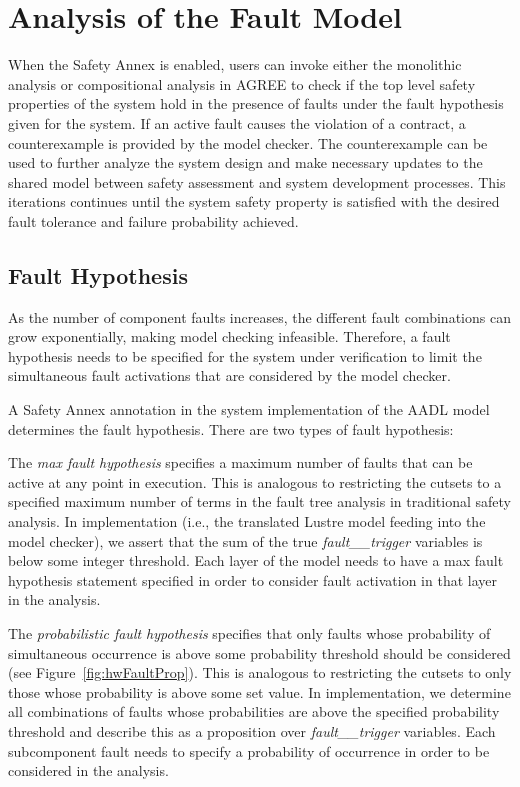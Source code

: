 \section{Analysis of the Fault Model}
\label{sec:fault_analysis}

When the Safety Annex is enabled, users can invoke either the monolithic analysis or compositional analysis in AGREE to check if the top level safety properties of the system hold in the presence of faults under the fault hypothesis given for the system. If an active fault causes the violation of a contract, a counterexample is provided by the model checker. The counterexample can be used to further analyze the system design and make necessary updates to the shared model between safety assessment and system development processes. This iterations continues until the system safety property is satisfied with the desired fault tolerance and failure probability achieved.

\subsection{Fault Hypothesis}
As the number of component faults increases, the different fault combinations can grow exponentially, making model checking infeasible. Therefore, a fault hypothesis needs to be specified for the system under verification to limit the simultaneous fault activations that are considered by the model checker.

A Safety Annex annotation in the system implementation of the AADL model determines the fault hypothesis. There are two types of fault hypothesis:

The \textit{max fault hypothesis} specifies a maximum number of faults that can be active at any point in execution. This is analogous to restricting the cutsets to a specified maximum number of terms in the fault tree analysis in
traditional safety analysis. In implementation (i.e., the translated Lustre model feeding into the model checker), we assert that the sum of the true {\em fault\_\_trigger} variables is below some integer threshold. Each layer of the model needs to have a max fault hypothesis statement specified in order to consider fault activation in that layer in the analysis.

The \textit{probabilistic fault hypothesis} specifies that only faults whose probability of simultaneous occurrence is above some probability threshold should be considered (see Figure~\ref{fig:hwFaultProp}). This is analogous to restricting the cutsets to only those whose probability is above some set value. In implementation, we determine all combinations of faults whose probabilities are above the specified probability threshold and describe this as a proposition over {\em fault\_\_trigger} variables. Each subcomponent fault needs to specify a probability of occurrence in order to be considered in the analysis.

